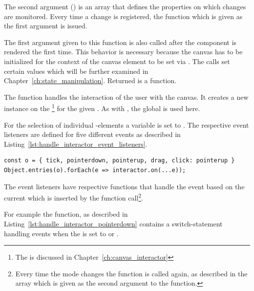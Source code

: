 The second argument () is an array that defines the properties on which changes are monitored.
Every time a change is registered, the function which is given as the first argument is issued.

The first argument given to this function is also called after the component is rendered the first time.
This behavior is necessary because the canvas has to be initialized for the context of the canvas element to be set via .
The  calls set certain values which will be further examined in Chapter~\ref{ch:state_manipulation}.
Returned is a  function.

The  function handles the interaction of the user with the canvas.
It creates a new instance on the \footnote{The  is discussed in Chapter~\ref{ch:canvas_interactor}} for the given .
As with , the global  is used here.

For the selection of individual -elements a  variable is set to .
The respective event listeners are defined for five different events as described in Listing~\ref{lst:handle_interactor_event_listeners}.

\begin{lstlisting}[label={lst:handle_interactor_event_listeners}, caption={Definition of event listeners on the \code{canvasInteractor}.}]
const o = { tick, pointerdown, pointerup, drag, click: pointerup }
Object.entries(o).forEach(e => interactor.on(...e));
\end{lstlisting}

The event listeners have respective functions that handle the event based on the current  which is inserted by the function call\footnote{Every time the mode changes the function is called again, as described in the array which is given as the second argument to the  function.}.

For example the  function, as described in Listing~\ref{lst:handle_interactor_pointerdown} contains a switch-statement handling events when the  is set to  or .

